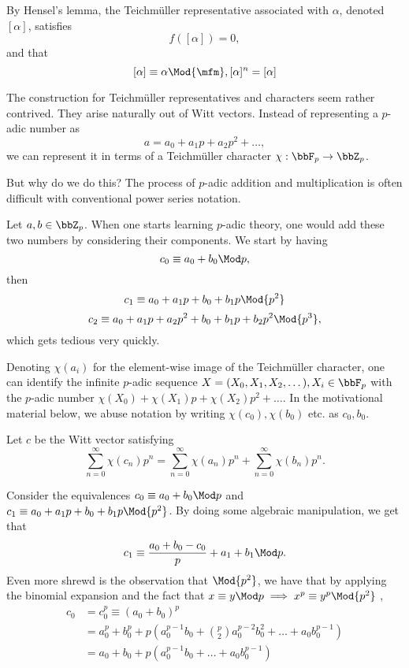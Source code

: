 \documentclass[a4paper, 12pt,oneside,openany]{book}
\begin{document}
By Hensel's lemma, the Teichmüller representative associated with $\alpha$, denoted $[\alpha]$, satisfies $$f([\alpha])=0,$$ and that $$[\alpha]\equiv \alpha \Mod {\mfm}, [\alpha]^n=[\alpha]$$ 

The construction for Teichmüller representatives and characters seem rather contrived. They arise naturally out of Witt vectors. Instead of representing a $p$-adic number as $$a=a_0+a_1p+a_2p^2+\dots,$$ we can represent it in terms of a Teichmüller character $\chi:\bbF_p \to \bbZ_p$. 


But why do we do this? The process of $p$-adic addition and multiplication is often difficult with conventional power series notation. 

Let $a, b \in \bbZ_p$. When one starts learning $p$-adic theory, one would add these two numbers by considering their components. We start by having $$c_0\equiv a_0+b_0 \Mod p,$$ then $$c_1\equiv a_0+a_1p+b_0+b_1p \Mod {p^2}$$ $$c_2\equiv a_0+a_1p+a_2p^2+b_0+b_1p+b_2p^2 \Mod{p^3},$$ which gets tedious very quickly. 

Denoting $\chi(a_i)$ for the element-wise image of the Teichmüller character, one can identify the infinite $p$-adic sequence $X=(X_0, X_1, X_2, \dots), X_i \in \bbF_p$ with the $p$-adic number $\chi(X_0)+\chi(X_1)p+\chi(X_2)p^2+\dots$. In the motivational material below, we abuse notation by writing $\chi(c_0), \chi(b_0)$ etc. as $c_0, b_0$. 

Let $c$ be the Witt vector satisfying $$\sum\limits_{n=0}^\infty \chi(c_n)p^n= \sum\limits_{n=0}^{\infty}\chi(a_n)p^n+\sum\limits_{n=0}^{\infty}\chi(b_n)p^n.$$

Consider the equivalences $c_0\equiv a_0+b_0 \Mod p$ and $c_1\equiv a_0+a_1p+b_0+b_1p \Mod {p^2}$. By doing some algebraic manipulation, we get that $$c_1 \equiv \frac{a_0+b_0-c_0}{p}+a_1+b_1 \Mod p.$$ Even more shrewd is the observation that $\Mod {p^2}$, we have that by applying the binomial expansion and the fact that $x \equiv y \Mod p \implies x^p \equiv y^p \Mod{p^2}$ , \begin{align*} c_0&=c_0^p \equiv (a_0+b_0)^p \\ &= a_0^p+b_0^p+p(a_0^{p-1}b_0+\binom{p}{2}a_0^{p-2}b_0^2+\dots+a_0b_0^{p-1}) \\ &= a_0+b_0+p(a_0^{p-1}b_0+\dots+a_0b_0^{p-1}) \end{align*}
\end{document}
